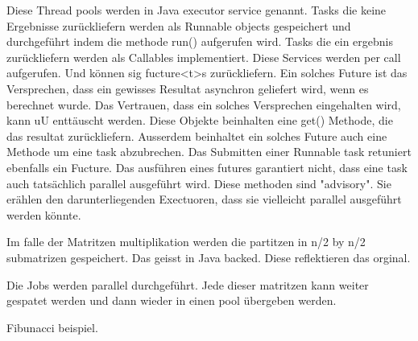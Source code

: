 Diese Thread pools werden in Java executor service genannt. Tasks die keine Ergebnisse zurückliefern werden als Runnable objects gespeichert und durchgeführt indem die methode run() aufgerufen wird. Tasks die ein ergebnis zurückliefern werden als Callables implementiert. Diese Services werden per call aufgerufen. Und können sig fucture<t>s zurückliefern. Ein solches Future ist das Versprechen, dass ein gewisses Resultat asynchron geliefert wird, wenn es berechnet wurde. Das Vertrauen, dass ein solches Versprechen eingehalten wird, kann uU enttäuscht werden. Diese Objekte beinhalten eine get() Methode, die das resultat zurückliefern. Ausserdem beinhaltet ein solches Future auch eine Methode um eine task abzubrechen. Das Submitten einer Runnable task retuniert ebenfalls ein Fucture. Das ausführen eines futures garantiert nicht, dass eine task auch tatsächlich parallel ausgeführt wird. Diese methoden sind "advisory". Sie erählen den darunterliegenden Exectuoren, dass sie vielleicht parallel ausgeführt werden könnte.

Im falle der Matritzen multiplikation werden die partitzen in n/2 by n/2 submatrizen gespeichert. Das geisst in Java backed. Diese reflektieren das orginal. 

Die Jobs werden parallel durchgeführt. Jede dieser matritzen kann weiter gespatet werden und dann wieder in einen pool übergeben werden. 


Fibunacci beispiel.



